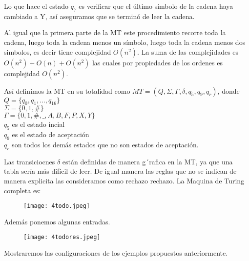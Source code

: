 \documentclass[12pt,letterpaper]{article}
\begin{document}
Lo que hace el estado $q_7$ es verificar que el último símbolo de la cadena haya cambiado a Y, así aseguramos que se terminó de leer la cadena.

Al igual que la primera parte de la MT este procedimiento recorre toda la cadena, luego toda la cadena menos un símbolo, luego toda la cadena menos dos simbolos, es decir tiene complejidad $O(n^2)$. La suma de las complejidades es $O(n^2)+O(n)+O(n^2)$ las cuales por propiedades de los ordenes es complejidad $O(n^2)$.

Así definimos la MT en su totalidad como $MT = (Q, \Sigma, \Gamma, \delta, q_5, q_9, q_r)$, donde\\
$Q = \{q_0,q_1,...,q_{16}\}$\\
$\Sigma = \{0,1,\#\}$\\
$\Gamma = \{0,1,\#,\_, A,B,F,P,X,Y\}$\\
$q_5$ es el estado incial\\
$q_9$ es el estado de aceptación\\
$q_r$ son todos los demás estados que no son estados de aceptación.

Las transiciocnes $\delta$ están definidas de manera g´rafica en la MT, ya que una tabla sería más difícil de leer. De igual manera las reglas que no se indican de manera explicita las consideramos como rechazo rechazo.
La Maquina de Turing completa es:
\newpage
\begin{figure}[htb]
    \centering
    \texttt{[image: 4todo.jpeg]}
\end{figure}

Además ponemos algunas entradas.

\begin{figure}[htb]
    \centering
    \texttt{[image: 4todores.jpeg]}
\end{figure}

Mostraremos las configuraciones de los ejemplos propuestos anteriormente.
\end{document}
